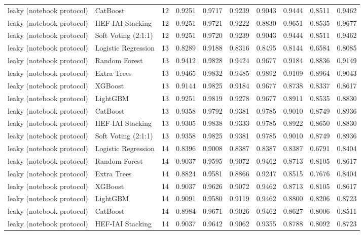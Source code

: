 \begin{tabular}{llrrrrrrrr}
leaky (notebook protocol) & CatBoost & 12 & 0.9251 & 0.9717 & 0.9239 & 0.9043 & 0.9444 & 0.8511 & 0.9462 \\
leaky (notebook protocol) & HEF-IAI Stacking & 12 & 0.9251 & 0.9721 & 0.9222 & 0.8830 & 0.9651 & 0.8535 & 0.9677 \\
leaky (notebook protocol) & Soft Voting (2:1:1) & 12 & 0.9251 & 0.9720 & 0.9239 & 0.9043 & 0.9444 & 0.8511 & 0.9462 \\
leaky (notebook protocol) & Logistic Regression & 13 & 0.8289 & 0.9188 & 0.8316 & 0.8495 & 0.8144 & 0.6584 & 0.8085 \\
leaky (notebook protocol) & Random Forest & 13 & 0.9412 & 0.9828 & 0.9424 & 0.9677 & 0.9184 & 0.8836 & 0.9149 \\
leaky (notebook protocol) & Extra Trees & 13 & 0.9465 & 0.9832 & 0.9485 & 0.9892 & 0.9109 & 0.8964 & 0.9043 \\
leaky (notebook protocol) & XGBoost & 13 & 0.9144 & 0.9825 & 0.9184 & 0.9677 & 0.8738 & 0.8337 & 0.8617 \\
leaky (notebook protocol) & LightGBM & 13 & 0.9251 & 0.9819 & 0.9278 & 0.9677 & 0.8911 & 0.8535 & 0.8830 \\
leaky (notebook protocol) & CatBoost & 13 & 0.9358 & 0.9792 & 0.9381 & 0.9785 & 0.9010 & 0.8749 & 0.8936 \\
leaky (notebook protocol) & HEF-IAI Stacking & 13 & 0.9305 & 0.9838 & 0.9333 & 0.9785 & 0.8922 & 0.8650 & 0.8830 \\
leaky (notebook protocol) & Soft Voting (2:1:1) & 13 & 0.9358 & 0.9825 & 0.9381 & 0.9785 & 0.9010 & 0.8749 & 0.8936 \\
leaky (notebook protocol) & Logistic Regression & 14 & 0.8396 & 0.9008 & 0.8387 & 0.8387 & 0.8387 & 0.6791 & 0.8404 \\
leaky (notebook protocol) & Random Forest & 14 & 0.9037 & 0.9595 & 0.9072 & 0.9462 & 0.8713 & 0.8105 & 0.8617 \\
leaky (notebook protocol) & Extra Trees & 14 & 0.8824 & 0.9581 & 0.8866 & 0.9247 & 0.8515 & 0.7676 & 0.8404 \\
leaky (notebook protocol) & XGBoost & 14 & 0.9037 & 0.9626 & 0.9072 & 0.9462 & 0.8713 & 0.8105 & 0.8617 \\
leaky (notebook protocol) & LightGBM & 14 & 0.9091 & 0.9580 & 0.9119 & 0.9462 & 0.8800 & 0.8206 & 0.8723 \\
leaky (notebook protocol) & CatBoost & 14 & 0.8984 & 0.9671 & 0.9026 & 0.9462 & 0.8627 & 0.8006 & 0.8511 \\
leaky (notebook protocol) & HEF-IAI Stacking & 14 & 0.9037 & 0.9642 & 0.9062 & 0.9355 & 0.8788 & 0.8092 & 0.8723 \\

\end{tabular}
